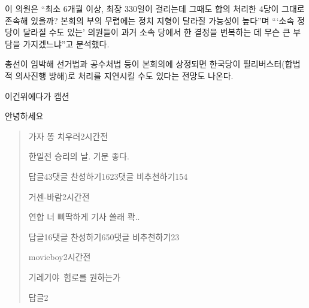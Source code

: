 \documentclass[final,doctor,korean,pdfdoc]{konkukthesis}
\begin{document}
이 의원은 ``최소 6개월 이상, 최장 330일이 걸리는데 그때도 합의 처리한 4당이 그대로 존속해 있을까? 본회의 부의 무렵에는 정치 지형이 달라질 가능성이 높다''며 ```소속 정당이 달라질 수도 있는' 의원들이 과거 소속 당에서 한 결정을 번복하는 데 무슨 큰 부담을 가지겠느냐''고 분석했다.

총선이 임박해 선거법과 공수처법 등이 본회의에 상정되면 한국당이 필리버스터(합법적 의사진행 방해)로 처리를 지연시킬 수도 있다는 전망도 나온다.
\begin{table}
 \caption{이건위에다가 캡션}
 안녕하세요 
\end{table}

\clearpage
\begin{abstract}
가자 똥 치우러2시간전 \par
한일전 승리의 날. 기분 좋다. \par
답글43댓글 찬성하기1623댓글 비추천하기154 

거센-바람2시간전 \par
연합 너 삐딱하게 기사 쓸래 콱.. \par
답글16댓글 찬성하기650댓글 비추천하기23 

movieboy2시간전 \par 
기레기야\, 험로를 원하는가 \par 
답글2
\end{abstract}


%
\end{document}
